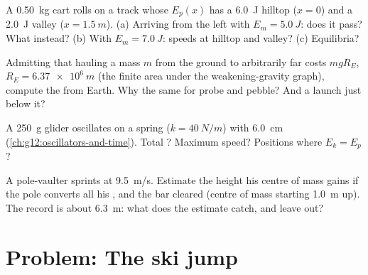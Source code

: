 \begin{exercise}[$\star\star\star$]\label{exo:g12:work-and-energy:12}
A \qty{0.50}{kg} cart rolls on a track whose $E_p(x)$ has a
\qty{6.0}{J} hilltop ($x = 0$) and a \qty{2.0}{J} valley
($x = \qty{1.5}{m}$). (a) Arriving from the left with
$E_m = \qty{5.0}{J}$: does it pass? What instead? (b) With
$E_m = \qty{7.0}{J}$: speeds at hilltop and valley? (c) Equilibria?
\end{exercise}

\begin{exercise}[$\star\star\star$]\label{exo:g12:work-and-energy:13}
Admitting that hauling a mass $m$ from the ground to arbitrarily far
costs $mgR_E$, $R_E = \qty{6.37e6}{m}$ (the finite area under the
weakening-gravity graph), compute the \emph{} from Earth.
Why the same for probe and pebble? And a launch just below it?
\end{exercise}

\begin{exercise}[$\star\star\star$]\label{exo:g12:work-and-energy:14}
A \qty{250}{g} glider oscillates on a spring ($k = \qty{40}{N/m}$)
with  \qty{6.0}{cm} (\cref{ch:g12:oscillators-and-time}).
Total ? Maximum speed? Positions where $E_k = E_p$?
\end{exercise}

\begin{exercise}[$\star\star\star$]\label{exo:g12:work-and-energy:15}
A pole-vaulter sprints at \qty{9.5}{m/s}. Estimate the height his
centre of mass gains if the pole converts all his , and
the bar cleared (centre of mass starting \qty{1.0}{m} up). The record
is about \qty{6.3}{m}: what does the estimate catch, and leave out?
\end{exercise}

\section{Problem: The ski jump}

